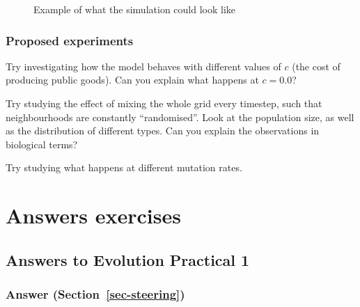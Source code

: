 \documentclass[
  letterpaper,
  DIV=11,
  numbers=noendperiod]{scrreprt}
\theoremstyle{definition}
\theoremstyle{remark}
\begin{document}
\begin{figure}


\caption{\label{fig-examplegrid}Example of what the simulation could
look like}

\end{figure}%

\subsection{Proposed experiments}\label{proposed-experiments}

Try investigating how the model behaves with different values of \(c\)
(the cost of producing public goods). Can you explain what happens at
\(c=0.0\)?

Try studying the effect of mixing the whole grid every timestep, such
that neighbourhoods are constantly ``randomised''. Look at the
population size, as well as the distribution of different types. Can you
explain the observations in biological terms?

Try studying what happens at different mutation rates.

\chapter{Answers exercises}\label{answers-exercises}

\section{Answers to Evolution Practical
1}\label{answers-to-evolution-practical-1}

\subsection{\texorpdfstring{Answer
(Section~\ref{sec-steering})}{Answer (Section~)}}\label{answer-sec-steering}
\end{document}

